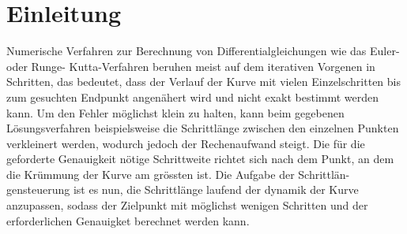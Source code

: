 %
%
%
\section{Einleitung\label{steps:section:einleitung}}

Numerische Verfahren zur Berechnung von Differentialgleichungen wie das Euler- oder Runge-
Kutta-Verfahren beruhen meist auf dem iterativen Vorgenen in Schritten, das bedeutet, dass der Verlauf
der Kurve mit vielen Einzelschritten bis zum gesuchten Endpunkt angenähert wird und nicht exakt
bestimmt werden kann. Um den Fehler möglichst klein zu halten, kann beim gegebenen Lösungsverfahren beispielsweise die Schrittlänge zwischen den einzelnen Punkten verkleinert werden, wodurch
jedoch der Rechenaufwand steigt. Die für die geforderte Genauigkeit nötige Schrittweite richtet sich
nach dem Punkt, an dem die Krümmung der Kurve am grössten ist. Die Aufgabe der Schrittlän-
gensteuerung ist es nun, die Schrittlänge laufend der dynamik der Kurve anzupassen, sodass der
Zielpunkt mit möglichst wenigen Schritten und der erforderlichen Genauigket berechnet werden
kann.

